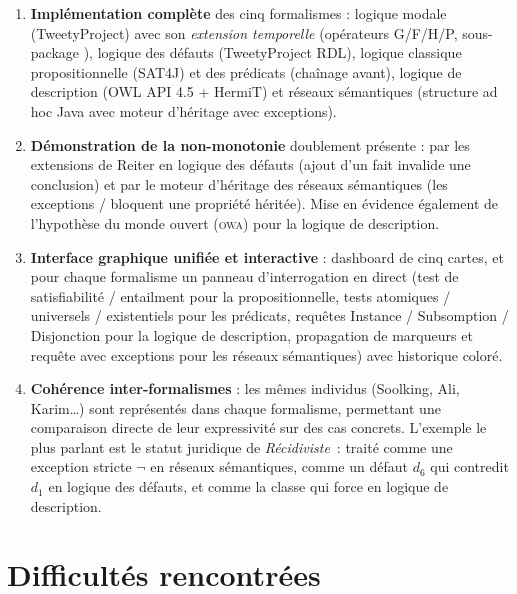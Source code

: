 \begin{enumerate}
  \item \textbf{Implémentation complète} des cinq formalismes : logique modale
        (TweetyProject) avec son \emph{extension temporelle} (opérateurs
        G/F/H/P, sous-package ), logique des défauts
        (TweetyProject RDL), logique classique propositionnelle (SAT4J) et des
        prédicats (chaînage avant), logique de description (OWL API 4.5 +
        HermiT) et réseaux sémantiques (structure ad hoc Java avec moteur
        d'héritage avec exceptions).

  \item \textbf{Démonstration de la non-monotonie} doublement présente : par
        les extensions de Reiter en logique des défauts (ajout d'un fait
        invalide une conclusion) et par le moteur d'héritage des réseaux
        sémantiques (les exceptions / bloquent une propriété
        héritée).
        Mise en évidence également de l'hypothèse du monde ouvert (\textsc{owa})
        pour la logique de description.

  \item \textbf{Interface graphique unifiée et interactive} : dashboard de cinq
        cartes, et pour chaque formalisme un panneau d'interrogation en direct
        (test de satisfiabilité / entailment pour la propositionnelle, tests
        atomiques / universels / existentiels pour les prédicats, requêtes
        Instance / Subsomption / Disjonction pour la logique de description,
        propagation de marqueurs et requête avec exceptions pour les réseaux
        sémantiques) avec historique coloré.

  \item \textbf{Cohérence inter-formalismes} : les mêmes individus (Soolking,
        Ali, Karim…) sont représentés dans chaque formalisme, permettant une
        comparaison directe de leur expressivité sur des cas concrets.
        L'exemple le plus parlant est le statut juridique de \emph{Récidiviste}~:
        traité comme une exception stricte $\lnot$ en réseaux
        sémantiques, comme un défaut $d_6$ qui contredit $d_1$ en logique des
        défauts, et comme la classe  qui force
         en logique de description.
\end{enumerate}

\section{Difficultés rencontrées}

